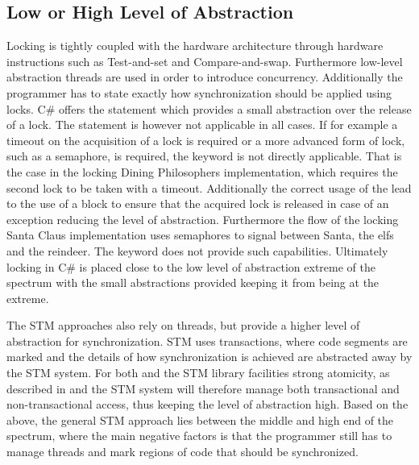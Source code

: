 \subsection{Low or High Level of Abstraction}\label{subsec:level_of_abstraction}
Locking is tightly coupled with the hardware architecture through hardware instructions such as Test-and-set and Compare-and-swap\cite[p. 1990]{scott2011sync}. Furthermore low-level abstraction threads are used in order to introduce concurrency. Additionally the programmer has to state exactly how synchronization should be applied using locks. C\# offers the  statement which provides a small abstraction over the release of a lock. The  statement is however not applicable in all cases. If for example a timeout on the acquisition of a lock is required or a more advanced form of lock, such as a semaphore, is required, the  keyword is not directly applicable. That is the case in the locking Dining Philosophers implementation, which requires the second lock to be taken with a timeout. Additionally the correct usage of the  lead to the use of a  block to ensure that the acquired lock is released in case of an exception reducing the level of abstraction. Furthermore the flow of the locking Santa Claus implementation uses semaphores to signal between Santa, the elfs and the reindeer. The  keyword does not provide such capabilities. Ultimately locking in C\# is placed close to the low level of abstraction extreme of the spectrum with the small abstractions provided keeping it from being at the extreme. 

The \ac{STM} approaches also rely on threads, but provide a higher level of abstraction for synchronization. \ac{STM} uses transactions, where code segments are marked and the details of how synchronization is achieved are abstracted away by the \ac{STM} system. For both \stmname and the \ac{STM} library facilities strong atomicity, as described in  and the \ac{STM} system will therefore manage both transactional and non-transactional access, thus keeping the level of abstraction high. Based on the above, the general \ac{STM} approach lies between the middle and high end of the spectrum, where the main negative factors is that the programmer still has to manage threads and mark regions of code that should be synchronized.

